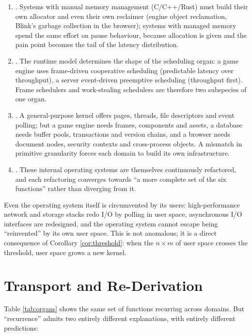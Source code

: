 \begin{enumerate}[label=(\alph*)]
\item {}. Systems with manual memory management (C/C++/Rust) must
      build their own allocator and even their own reclaimer (engine object reclamation,
      Blink's garbage collection in the browser); systems with managed memory spend the same
      effort on pause behaviour, because allocation is given and the pain point becomes the
      tail of the latency distribution.
\item {}. The runtime model determines the shape of the
      scheduling organ: a game engine uses frame-driven cooperative scheduling (predictable
      latency over throughput), a server event-driven preemptive scheduling (throughput
      first). Frame schedulers and work-stealing schedulers are therefore two subspecies of
      one organ.
\item {}. A general-purpose kernel offers pages,
      threads, file descriptors and event polling; but a game engine needs frames,
      components and assets, a database needs buffer pools, transactions and version chains,
      and a browser needs document nodes, security contexts and cross-process objects. A
      mismatch in primitive granularity forces each domain to build its own infrastructure.
\item {}. These internal operating systems are themselves
      continuously refactored, and each refactoring converges towards ``a more complete set
      of the six functions'' rather than diverging from it.
\end{enumerate}

Even the operating system itself is circumvented by its users: high-performance network and
storage stacks redo I/O by polling in user space, asynchronous I/O interfaces are redesigned,
and the operating system cannot escape being ``reinvented'' by its own user space. This is
not anomalous; it is a direct consequence of Corollary \ref{cor:threshold}: when the
$n \times m$ of user space crosses the threshold, user space grows a new kernel.

\section{Transport and Re-Derivation}\label{sec:transport}

Table \ref{tab:organs} shows the same set of functions recurring across domains. But
``recurrence'' admits two entirely different explanations, with entirely different
predictions:

